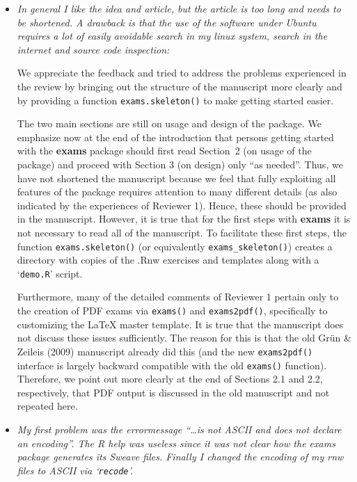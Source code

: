 \documentclass[a4paper]{article}
\begin{document}
\begin{itemize}

\item {\it
In general I like the idea and article, but the article is too long and
needs to be shortened. A drawback is that the use of the software under
Ubuntu requires a lot of easily avoidable search in my linux system, search
in the internet and source code inspection:}

We appreciate the feedback and tried to address the problems experienced
in the review by bringing out the structure of the manuscript more clearly
and by providing a function \texttt{exams.skeleton()} to make getting started
easier.

The two main sections are still on usage and design of the package. We
emphasize now at the end of the introduction that persons getting started
with the \textbf{exams} package should first read Section~2 (on usage of the package)
and proceed with Section 3 (on design) only ``as needed''. Thus, we have not
shortened the manuscript because we feel that fully exploiting all features
of the package requires attention to many different details (as also indicated
by the experiences of Reviewer 1). Hence, these should be provided in the
manuscript. However, it is true that for the first steps with \textbf{exams} it
is not necessary to read all of the manuscript. To facilitate these first
steps, the function \texttt{exams.skeleton()} (or equivalently \verb|exams_skeleton()|)
creates a directory with copies of the .Rnw exercises and templates along
with a `\texttt{demo.R}' script.

Furthermore, many of the detailed comments of Reviewer 1 pertain only to
the creation of PDF exams via \texttt{exams()} and \texttt{exams2pdf()}, specifically to
customizing the {\LaTeX} master template. It is true that the manuscript does
not discuss these issues sufficiently. The reason for this is that the old
Gr\"un \& Zeileis (2009) manuscript already did this (and the new \texttt{exams2pdf()}
interface is largely backward compatible with the old \texttt{exams()} function).
Therefore, we point out more clearly at the end of Sections 2.1 and 2.2,
respectively, that PDF output is discussed in the old manuscript and not
repeated here.

\item {\it
My first problem was the errormessage ``\dots is not ASCII and does not
declare an encoding''.  The R help was useless since it was not clear how
the exams package generates its Sweave files.  Finally I changed the
encoding of my rnw files to ASCII via `\texttt{recode}'.}


\end{itemize}
\end{document}
